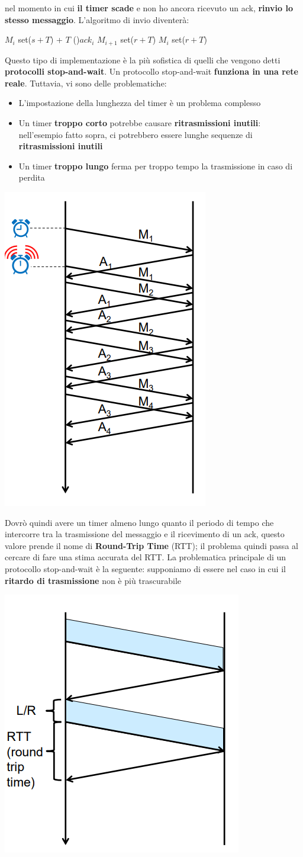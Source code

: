 \documentclass[12pt]{article}
\begin{document}
nel momento in cui \textbf{il timer scade} e non ho ancora ricevuto un ack, \textbf{rinvio lo stesso messaggio}. L'algoritmo di invio diventerà: \newline
\begin{algorithm}[H]
    \DontPrintSemicolon
     {
        $M_i$\;
        set($s+T$) + $T$
    } {
        \eIf(){$ack_i$} {
            $M_{i+1}$\;
            set($r+T$)
        } {
            $M_i$\;
            set($r+T$)
        }
    }
\end{algorithm}
\noindent
Questo tipo di implementazione è la più sofistica di quelli che vengono detti \textbf{protocolli stop-and-wait}.
Un protocollo stop-and-wait \textbf{funziona in una rete reale}. Tuttavia, vi sono delle problematiche:
\begin{itemize}
    \item L'impostazione della lunghezza del timer è un problema complesso
    \item Un timer \textbf{troppo corto} potrebbe causare \textbf{ritrasmissioni inutili}: nell'esempio fatto sopra, ci potrebbero essere lunghe sequenze di \textbf{ritrasmissioni inutili}
    \item Un timer \textbf{troppo lungo} ferma per troppo tempo la trasmissione in caso di perdita
\end{itemize}
\begin{center}
    \includegraphics[width = 0.25\linewidth]{Images/51.png}
\end{center}
Dovrò quindi avere un timer almeno lungo quanto il periodo di tempo che intercorre tra la trasmissione del messaggio e il ricevimento di un ack, questo valore
prende il nome di \textbf{Round-Trip Time} (RTT); il problema quindi passa al cercare di fare una stima accurata del RTT.
La problematica principale di un protocollo stop-and-wait è la seguente: supponiamo di essere nel caso in cui il \textbf{ritardo di trasmissione} non è più trascurabile
\begin{center}
    \includegraphics[width = 0.40\linewidth]{Images/52.png}
\end{center}
\end{document}
